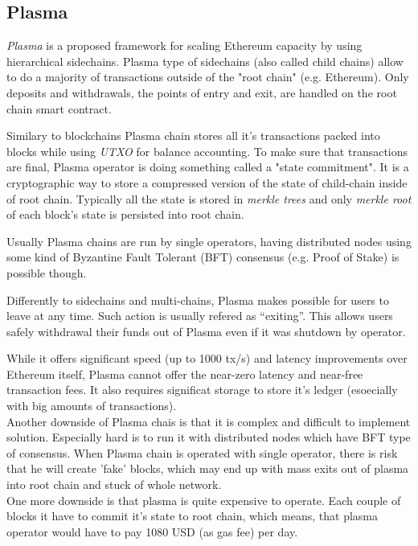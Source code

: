 \documentclass[a4paper,12pt]{article}
\begin{document}
\subsection{Plasma}

\textit{Plasma} \cite{plasma} is a proposed framework for scaling Ethereum 
capacity by using hierarchical sidechains. Plasma type of sidechains (also 
called child chains) allow to do a majority of transactions outside of the "root
chain" (e.g. Ethereum). Only deposits and withdrawals, the points of entry and 
exit, are handled on the root chain smart contract.

Similary to blockchains Plasma chain stores all it's transactions packed into 
blocks while using \textit{UTXO} for balance accounting. To make sure that 
transactions are final, Plasma operator is doing something called a "state 
commitment". It is a cryptographic way to store a compressed version of the 
state of child-chain inside of root chain. Typically all the state is stored in
\textit{merkle trees} and only \textit{merkle root} of each block's state is 
persisted into root chain.

Usually Plasma chains are run by single operators, having distributed nodes 
using some kind of Byzantine Fault Tolerant (BFT) consensus (e.g. Proof of 
Stake) is possible though.

Differently to sidechains and multi-chains, Plasma makes possible for users to 
leave at any time. Such action is usually refered as “exiting”. This allows users 
safely withdrawal their funds out of Plasma even if it was shutdown by operator.

While it offers significant speed (up to 1000 tx/s) and latency improvements 
over Ethereum itself, Plasma cannot offer the near-zero latency and near-free 
transaction fees. It also requires significat storage to store it's ledger
(esoecially with big amounts of transactions).\\

Another downside of Plasma chais is that it is complex and difficult to 
implement solution. Especially hard is to run it with distributed nodes which 
have BFT type of consensus. When Plasma chain is operated with single operator, 
there is risk that he will create 'fake' blocks, which may end up with mass 
exits out of plasma into root chain and stuck of whole network.\\

One more downside is that plasma is quite expensive to operate. Each couple of 
blocks it have to commit it's state to root chain, which means, that plasma 
operator would have to pay 1080 USD (as gas fee) per day. 
\end{document}
